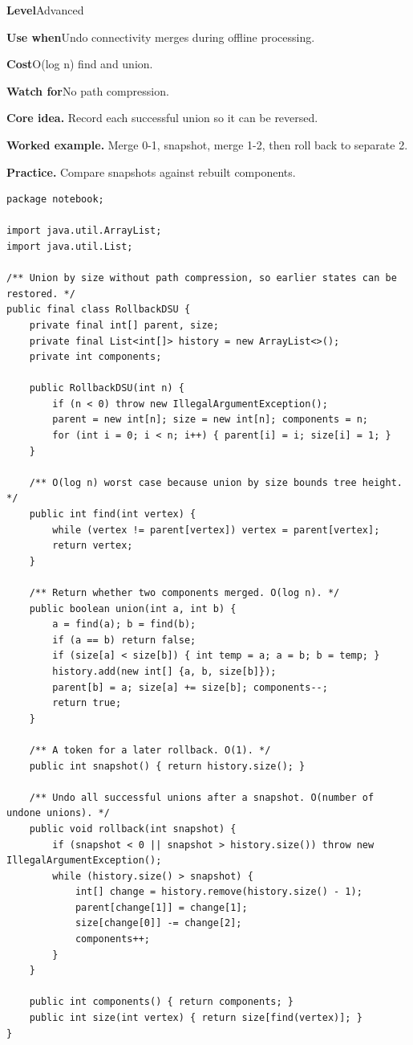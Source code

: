 \documentclass[10pt,letterpaper]{article}
\newcommand{\entrylabel}[1]{\textcolor{accent}{\bfseries #1}}
\begin{document}
\begin{guidebox}\small
\entrylabel{Level}\quad Advanced\par
\entrylabel{Use when}\quad Undo connectivity merges during offline processing.\par
\entrylabel{Cost}\quad O(log n) find and union.\par
\entrylabel{Watch for}\quad No path compression.\par
\end{guidebox}
\noindent\textbf{Core idea.} Record each successful union so it can be reversed.\par
\noindent\textbf{Worked example.} Merge 0-1, snapshot, merge 1-2, then roll back to separate 2.\par
\noindent\textbf{Practice.} Compare snapshots against rebuilt components.\par
\begin{lstlisting}
package notebook;

import java.util.ArrayList;
import java.util.List;

/** Union by size without path compression, so earlier states can be restored. */
public final class RollbackDSU {
    private final int[] parent, size;
    private final List<int[]> history = new ArrayList<>();
    private int components;

    public RollbackDSU(int n) {
        if (n < 0) throw new IllegalArgumentException();
        parent = new int[n]; size = new int[n]; components = n;
        for (int i = 0; i < n; i++) { parent[i] = i; size[i] = 1; }
    }

    /** O(log n) worst case because union by size bounds tree height. */
    public int find(int vertex) {
        while (vertex != parent[vertex]) vertex = parent[vertex];
        return vertex;
    }

    /** Return whether two components merged. O(log n). */
    public boolean union(int a, int b) {
        a = find(a); b = find(b);
        if (a == b) return false;
        if (size[a] < size[b]) { int temp = a; a = b; b = temp; }
        history.add(new int[] {a, b, size[b]});
        parent[b] = a; size[a] += size[b]; components--;
        return true;
    }

    /** A token for a later rollback. O(1). */
    public int snapshot() { return history.size(); }

    /** Undo all successful unions after a snapshot. O(number of undone unions). */
    public void rollback(int snapshot) {
        if (snapshot < 0 || snapshot > history.size()) throw new IllegalArgumentException();
        while (history.size() > snapshot) {
            int[] change = history.remove(history.size() - 1);
            parent[change[1]] = change[1];
            size[change[0]] -= change[2];
            components++;
        }
    }

    public int components() { return components; }
    public int size(int vertex) { return size[find(vertex)]; }
}
\end{lstlisting}
\end{document}
